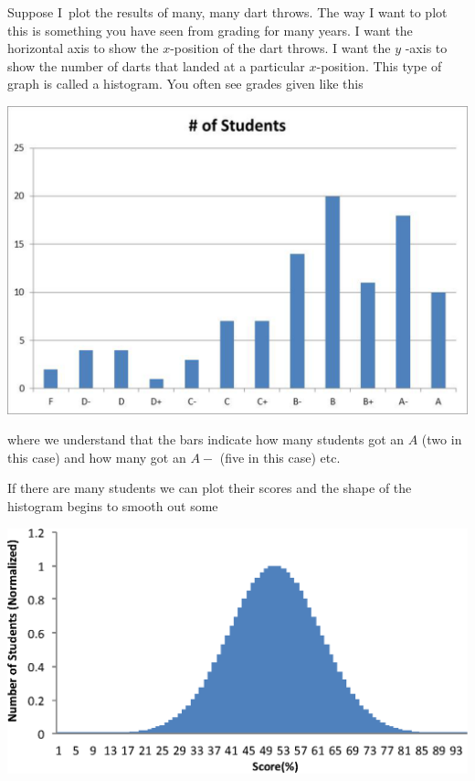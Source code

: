 \documentclass{book}%
\begin{document}
Suppose I\ plot the results of many, many dart throws. The way I want to
plot this is something you have seen from grading for many years. I want the
horizontal axis to show the $x$-position of the dart throws. I want the $y$%
-axis to show the number of darts that landed at a particular $x$-position.
This type of graph is called a histogram. You often see grades given like
this

\begin{center}
\includegraphics[scale=0.5]{Lab2_figs/hist_few.eps}
\end{center}

where we understand that the bars
indicate how many students got an $A$ (two in this case) and how many got an 
$A-$ (five in this case) etc.

If there are many students we can plot their scores and the shape of the
histogram begins to smooth out some

\begin{center}
\includegraphics[scale=0.5]{Lab2_figs/hist_many.eps}
\end{center}
\end{document}
